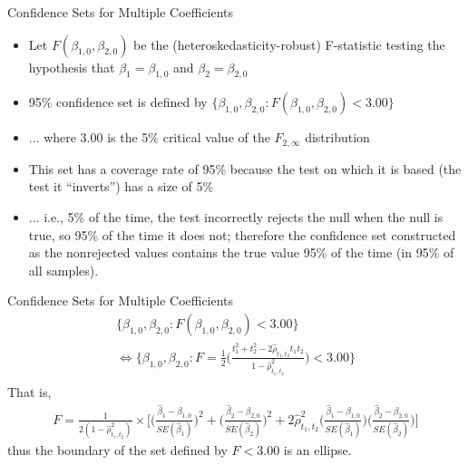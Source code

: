 \documentclass[notes,10pt, aspectratio=169]{beamer}
\begin{document}
\begin{frame}{Confidence Sets for Multiple Coefficients}
\begin{itemize}
    \item Let $F(\beta_{1,0}, \beta_{2,0})$ be the (heteroskedasticity-robust) F-statistic testing the hypothesis that $\beta_{1}=\beta_{1,0}$ and $\beta_{2}=\beta_{2,0}$\\[1em]
    \item 95\% confidence set is defined by $\{\beta_{1,0}, \beta_{2,0}: F(\beta_{1,0}, \beta_{2,0})<3.00\}$\\[1em]
    \item ... where 3.00 is the 5\% critical value of the $F_{2, \infty}$ distribution\\[1em]
    \item This set has a coverage rate of 95\% because the test on which it is based (the test it “inverts”) has a size of 5\%\\[1em]
    \item ... i.e., 5\% of the time, the test incorrectly rejects the null when the null is true, so 95\% of the time it does not; therefore the confidence set constructed as the nonrejected values contains the true value 95\% of the time (in 95\% of all samples).
\end{itemize}
\end{frame}


\begin{frame}{Confidence Sets for Multiple Coefficients}
\begin{eqnarray*}
    \biggl\{\beta_{1,0}, \beta_{2,0}: F(\beta_{1,0}, \beta_{2,0})<3.00\biggr\}\\
    \Leftrightarrow\biggl\{\beta_{1,0}, \beta_{2,0}: F=\frac{1}{2}\biggl( \frac{t_1^2+t_2^2-2\hat{\rho}_{t_1, t_2}t_1t_2}{1-\hat{\rho}^2_{t_1, t_2}}\biggr)<3.00\biggr\}\\
\end{eqnarray*}
That is,
\begin{eqnarray*}
    F=\frac{1}{2(1-\hat{\rho}^2_{t_1, t_2})} \times \biggr[\biggl( \frac{\hat{\beta}_1-\beta_{1,0}}{SE(\hat{\beta}_1)}\biggr)^2+\biggl( \frac{\hat{\beta}_2-\beta_{2,0}}{SE(\hat{\beta}_2)}\biggr)^2+ 2\hat{\rho}^2_{t_1, t_2}\biggl(\frac{\hat{\beta}_1-\beta_{1,0}}{SE(\hat{\beta}_1)}\biggr)\biggl(\frac{\hat{\beta}_2-\beta_{2,0}}{SE(\hat{\beta}_2)}\biggr)\biggr]
\end{eqnarray*}
thus the boundary of the set defined by $F<3.00$ is an ellipse.
\end{frame}
\end{document}
